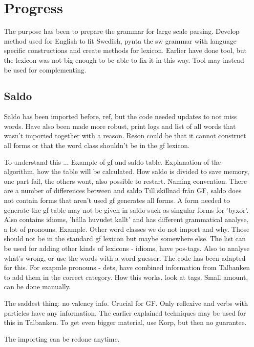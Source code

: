 \documentclass{article}
\begin{document}
\section{Progress}  
 The purpose has been to prepare the grammar for large scale parsing.
 Develop method used for English to fit Swedish, pynta the sw grammar with
 language specific constructions and create methods for lexicon.
 Earlier have done tool, but the lexicon was not big enough to be able
 to fix it in this way. Tool may instead be used for complementing.

\subsection{Saldo}
Saldo has been imported before, ref, but the code needed updates to not miss words.
Have also been made more robust, print logs and list of all words that wasn't
imported together with a reason. Reson could be that it cannot construct all forms
or that the word class shouldn't be in the gf lexicon.

To understand this ... Example of gf and saldo table. Explanation of the algorithm,
how the table will be calculated. How saldo is divided to save memory, one part fail, the others 
wont, also possible to restart. Naming convention.
There are a number of differences between and saldo Till skillnad från GF,
saldo does not contain forms that aren't used gf generates all forms. A form
needed to generate the gf table may not be given in saldo such as singular
forms for 'byxor'. Also contains idioms, 'hålla huvudet kallt' and has
different grammatical analyse, a lot of pronouns. Example. 
Other word classes we do not import and why.
Those should not be in the standard gf lexicon but maybe somewhere else.
The list can be used for adding other kinds of lexicons - idioms, have pos-tags.
Also to analyse what's wrong, or use the words with a word guesser. The code
has been adapted for this.
For exapmle pronouns - dets, have combined information from Talbanken to add them in the correct
category. How this works, look at tags. Small amount, can be done manually.

The saddest thing: no valency info. Crucial for GF. Only reflexive and verbs with particles
have any information. The earlier explained techniques may be used for this in Talbanken.
To get even bigger material, use Korp, but then no guarantee.

The importing can be redone anytime.
\end{document}
